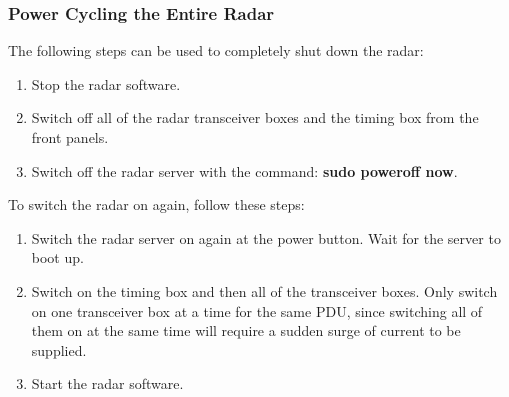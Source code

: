 \subsubsection{Power Cycling the Entire Radar}
The following steps can be used to completely shut down the radar:
\begin{enumerate}
	\item Stop the radar software.
	\item Switch off all of the radar transceiver boxes and the timing box from the front panels.
	\item Switch off the radar server with the command: \textbf{sudo poweroff now}.
\end{enumerate}
\par
To switch the radar on again, follow these steps:
\begin{enumerate}
	\item Switch the radar server on again at the power button. Wait for the server to boot up.
	\item Switch on the timing box and then all of the transceiver boxes. Only switch on one transceiver box at a time for the same PDU, since switching all of them on at the same time will require a sudden surge of current to be supplied.
	\item Start the radar software.
\end{enumerate}

